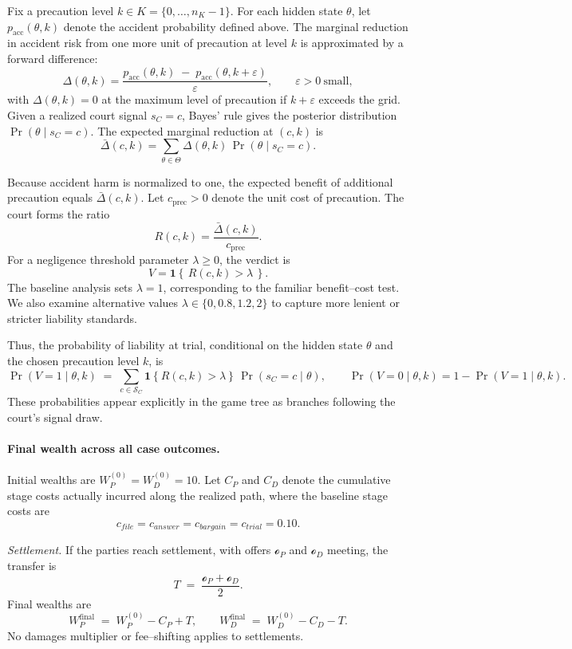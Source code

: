 \documentclass{article}
\begin{document}
Fix a precaution level $k\in K=\{0,\dots,n_K-1\}$. For each hidden state $\theta$, let $p_{\mathrm{acc}}(\theta,k)$ denote the accident probability defined above. The marginal reduction in accident risk from one more unit of precaution at level $k$ is approximated by a forward difference:
\[
\Delta(\theta,k)
=
\frac{p_{\mathrm{acc}}(\theta,k)\;-\;p_{\mathrm{acc}}(\theta,k+\varepsilon)}{\varepsilon},
\qquad \varepsilon>0\ \text{small},
\]
with $\Delta(\theta,k)=0$ at the maximum level of precaution if $k+\varepsilon$ exceeds the grid. Given a realized court signal $s_C=c$, Bayes’ rule gives the posterior distribution $\Pr(\theta \mid s_C=c)$. The expected marginal reduction at $(c,k)$ is
\[
\bar{\Delta}(c,k)=\sum_{\theta\in\Theta}\Delta(\theta,k)\,\Pr(\theta\mid s_C=c).
\]

Because accident harm is normalized to one, the expected benefit of additional precaution equals $\bar{\Delta}(c,k)$. Let $c_{\mathrm{prec}}>0$ denote the unit cost of precaution. The court forms the ratio
\[
R(c,k)=\frac{\bar{\Delta}(c,k)}{c_{\mathrm{prec}}}.
\]
For a negligence threshold parameter $\lambda \ge 0$, the verdict is
\[
V=\mathbf{1}\!\left\{\,R(c,k)>\lambda\,\right\}.
\]
The baseline analysis sets $\lambda=1$, corresponding to the familiar benefit–cost test. We also examine alternative values $\lambda\in\{0,0.8,1.2,2\}$ to capture more lenient or stricter liability standards.

Thus, the probability of liability at trial, conditional on the hidden state $\theta$ and the chosen precaution level $k$, is
\[
\Pr(V=1\mid \theta,k)\;=\;\sum_{c\in\mathcal{S}_C}\mathbf{1}\!\left\{R(c,k)>\lambda\right\}\,\Pr(s_C=c\mid \theta),
\qquad
\Pr(V=0\mid \theta,k)=1-\Pr(V=1\mid \theta,k).
\]
These probabilities appear explicitly in the game tree as branches following the court’s signal draw.


\paragraph{Final wealth across all case outcomes.}
Initial wealths are $W_P^{(0)}=W_D^{(0)}=10$. Let $C_P$ and $C_D$ denote the cumulative stage costs actually incurred along the realized path, where the baseline stage costs are
\[
c_{file}=c_{answer}=c_{bargain}=c_{trial}=0.10.
\]

\emph{Settlement.} If the parties reach settlement, with offers $\mathcal{o}_P$ and $\mathcal{o}_D$ meeting, the transfer is
\[
T \;=\; \frac{\mathcal{o}_P+\mathcal{o}_D}{2}.
\]
Final wealths are
\[
W_P^{\mathrm{final}} \;=\; W_P^{(0)} - C_P + T,
\qquad
W_D^{\mathrm{final}} \;=\; W_D^{(0)} - C_D - T.
\]
No damages multiplier or fee–shifting applies to settlements.
\end{document}
